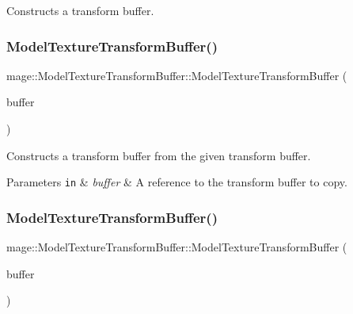 Constructs a transform buffer. \hypertarget{structmage_1_1_model_texture_transform_buffer_a5b0c7030b2e48302e6c071935a4bc7d5}{}\label{structmage_1_1_model_texture_transform_buffer_a5b0c7030b2e48302e6c071935a4bc7d5} 
\subsubsection{\texorpdfstring{Model\+Texture\+Transform\+Buffer()}{ModelTextureTransformBuffer()}\hspace{0.1cm}{\footnotesize\ttfamily [2/3]}}
{\footnotesize\ttfamily mage\+::\+Model\+Texture\+Transform\+Buffer\+::\+Model\+Texture\+Transform\+Buffer (\begin{DoxyParamCaption}\item[{const \hyperlink{structmage_1_1_model_texture_transform_buffer}{Model\+Texture\+Transform\+Buffer} \&}]{buffer }\end{DoxyParamCaption})\hspace{0.3cm}{\ttfamily [default]}}

Constructs a transform buffer from the given transform buffer.


\begin{DoxyParams}[1]{Parameters}
\mbox{\tt in}  & {\em buffer} & A reference to the transform buffer to copy. \\
\hline
\end{DoxyParams}
\hypertarget{structmage_1_1_model_texture_transform_buffer_a35516b344752486fa40cd14b59e17ec9}{}\label{structmage_1_1_model_texture_transform_buffer_a35516b344752486fa40cd14b59e17ec9} 
\subsubsection{\texorpdfstring{Model\+Texture\+Transform\+Buffer()}{ModelTextureTransformBuffer()}\hspace{0.1cm}{\footnotesize\ttfamily [3/3]}}
{\footnotesize\ttfamily mage\+::\+Model\+Texture\+Transform\+Buffer\+::\+Model\+Texture\+Transform\+Buffer (\begin{DoxyParamCaption}\item[{\hyperlink{structmage_1_1_model_texture_transform_buffer}{Model\+Texture\+Transform\+Buffer} \&\&}]{buffer }\end{DoxyParamCaption})\hspace{0.3cm}{\ttfamily [default]}}

